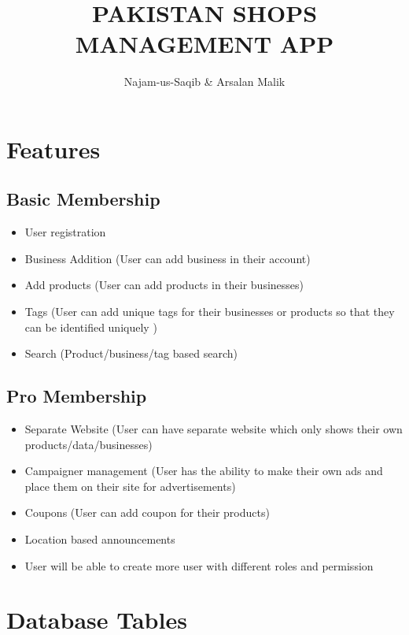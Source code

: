 \documentclass[a4paper]{report}
\title{PAKISTAN SHOPS MANAGEMENT APP}
\author{Najam-us-Saqib \& Arsalan Malik}
\begin{document}
\maketitle
\tableofcontents
\listoftables

\section{Features}
\subsection{Basic Membership}
\begin{itemize} 
\item User registration
\item Business Addition (User can add business in their account)
\item Add products (User can add products in their businesses)
\item Tags (User can add unique tags for their businesses or products so that they can be identified uniquely )
\item Search (Product/business/tag based search)
\end{itemize}

\subsection{Pro Membership} 
\begin{itemize} 
\item Separate Website (User can have separate website which only shows their own products/data/businesses)
\item Campaigner management (User has the ability to make their own ads and place them on their site for advertisements)
\item Coupons (User can add coupon for their products)
\item Location based announcements
\item User  will be able to create more user with different roles and permission
\end{itemize}


\newpage
\section{Database Tables}
\end{document}
